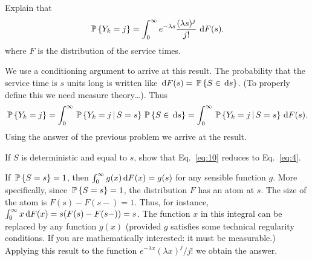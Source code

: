 \begin{question}
 Explain that 
\begin{equation}\label{eq:10}
  \P{Y_k = j} = \int_0^\infty e^{-\lambda s}\frac{(\lambda s)^j}{j!}\, \d F(s).
\end{equation}
where $F$ is the distribution of the service times.
\begin{solution}
  We use a conditioning argument to arrive at this result. The
    probability that the service time is $s$ units long is written
    like $\d F(s) = \P{S\in \d s}$. (To properly define this we need
    measure theory\ldots). Thus
    \begin{equation*}
    \P{Y_k=j} = \int_0^\infty \P{Y_k =j\given S=s}\P{S\in \d s} =
    \int_0^\infty \P{Y_k =j\given S=s} \d F(s).
    \end{equation*}
    Using the answer of the previous problem we arrive at the result.
\end{solution}
\end{question}

\begin{question}
 If $S$ is deterministic and equal to $s$, show that
  Eq.~\eqref{eq:10} reduces to Eq.~\eqref{eq:4}.
  \begin{solution}
    If $\P{S=s}=1$, then $\int_0^\infty g(x) \d F(x) = g(s)$ for any
    sensible function $g$. More specifically, since $\P{S=s}=1$, the
    distribution $F$ has an atom at $s$. The size of the atom is
    $F(s)-F(s-)=1$. Thus, for instance,
    $\int_0^\infty x \d F(x) = s (F(s)-F(s-)) =s$. The function $x$ in
    this integral can be replaced by any function $g(x)$ (provided $g$
    satisfies some technical regularity conditions. If you are
    mathematically interested: it must be measurable.)  Applying this
    result to the function $e^{-\lambda x}(\lambda x)^j/j!$ we obtain
    the answer.
  \end{solution}
\end{question}

